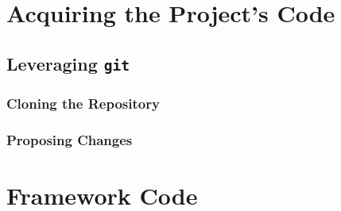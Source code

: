     \section{Acquiring the Project's Code}
        \subsection{Leveraging \texttt{git}}
            \subsubsection{Cloning the Repository}
            \subsubsection{Proposing Changes}
    \section{Framework Code}